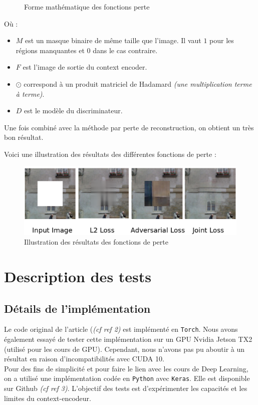 \documentclass[11pt,a4paper]{article}
\begin{document}
\begin{enumerate}[noitemsep]
\begin{figure}[H]
                    \caption{Forme mathématique des fonctions perte}
                \end{figure}
                Où :
        		\begin{itemize}[noitemsep]
			        \item $M$ est un masque binaire de même taille que l'image. Il vaut $1$ pour les régions manquantes et $0$ dans le cas contraire.
			        \item $F$ est l'image de sortie du context encoder.
			        \item $\odot$ correspond à un produit matriciel de Hadamard \emph{(une multiplication terme à terme)}.
			        \item $D$ est le modèle du discriminateur.
		        \end{itemize}
                Une fois combiné avec la méthode par perte de reconstruction, on obtient un très bon résultat.\\
            \end{enumerate}

            Voici une illustration des résultats des différentes fonctions de perte :
            \begin{figure}[H]
                \centering
                \includegraphics[scale=0.35]{loss.png} 
                \caption{Illustration des résultats des fonctions de perte}
            \end{figure}
            
    \section{Description des tests}
        \subsection{Détails de l'implémentation}
            Le code original de l’article (\emph{(cf ref 2)} est implémenté en \texttt{Torch}. Nous avons également essayé de tester cette implémentation sur un GPU Nvidia Jetson TX2 (utilisé pour les cours de GPU). Cependant, nous n'avons pas pu aboutir à un résultat en raison d'incompatibilités avec CUDA 10.\\
            Pour des fins de simplicité et pour faire le lien avec les cours de Deep Learning, on a utilisé une implémentation codée en \texttt{Python} avec \texttt{Keras}. Elle est disponible sur Github \emph{(cf ref 3)}. L'objectif des tests est d’expérimenter les capacités et les limites du context-encodeur.
\end{document}
